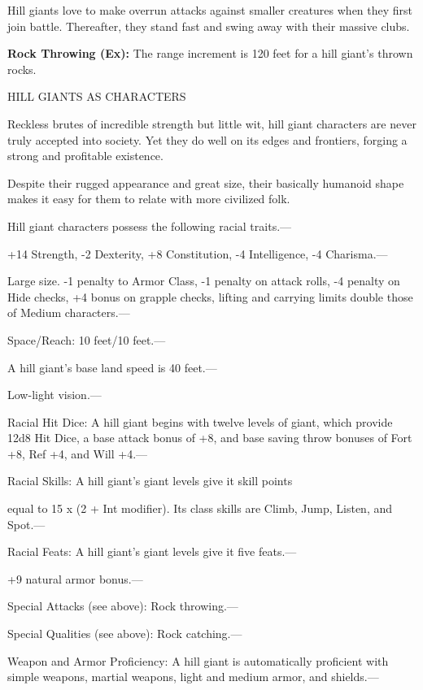 \documentclass{article}
\begin{document}
Hill giants love to make overrun attacks against smaller creatures when they first 
join battle. Thereafter, they stand fast and swing away with their massive clubs.

\textbf{Rock Throwing (Ex):} The range increment is 120 feet for a hill giant's 
thrown rocks.

\vspace{12pt}
HILL GIANTS AS CHARACTERS

Reckless brutes of incredible strength but little wit, hill giant characters are 
never truly accepted into society. Yet they do well on its edges and frontiers, 
forging a strong and profitable existence.

Despite their rugged appearance and great size, their basically humanoid shape 
makes it easy for them to relate with more civilized folk.

Hill giant characters possess the following racial traits.--- 

\parindent=3pt
+14 Strength, -2 Dexterity, +8 Constitution, -4 Intelligence, -4 Charisma.---

\parindent=0pt
Large size. -1 penalty to Armor Class, -1 penalty on attack rolls, -4 penalty on 
Hide checks, +4 bonus on grapple checks, lifting and carrying limits double those 
of Medium characters.---

Space/Reach: 10 feet/10 feet.---

A hill giant's base land speed is 40 feet.---

Low-light vision.---

Racial Hit Dice: A hill giant begins with twelve levels of giant, which provide 
12d8 Hit Dice, a base attack bonus of +8, and base saving throw bonuses of Fort 
+8, Ref +4, and Will +4.---

Racial Skills: A hill giant's giant levels give it skill points

equal to 15 x (2 + Int modifier). Its class skills are Climb, Jump, Listen, and 
Spot.---

Racial Feats: A hill giant's giant levels give it five feats.--- 

\parindent=3pt
+9 natural armor bonus.---

\parindent=0pt
Special Attacks (see above): Rock throwing.---

Special Qualities (see above): Rock catching.---

Weapon and Armor Proficiency: A hill giant is automatically proficient with simple 
weapons, martial weapons, light and medium armor, and shields.---
\end{document}
